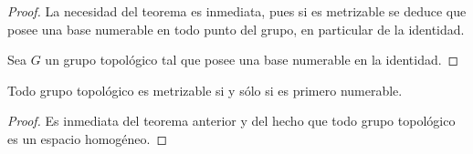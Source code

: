 \documentclass[12pt]{report}
\theoremstyle{largebreak}
\begin{document}
    \begin{proof}
        La necesidad del teorema es inmediata, pues si es metrizable se deduce que posee una base numerable en todo punto del grupo, en particular de la identidad.

        Sea $G$ un grupo topológico tal que posee una base numerable en la identidad.
    \end{proof}

    \begin{cor}
        Todo grupo topológico es metrizable si y sólo si es primero numerable.
    \end{cor}

    \begin{proof}
        Es inmediata del teorema anterior y del hecho que todo grupo topológico es un espacio homogéneo.

    \end{proof}
\end{document}
